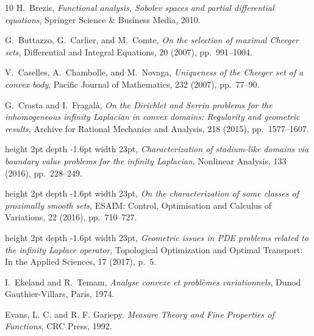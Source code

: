 \documentclass[reqno,11pt]{amsart}
\theoremstyle{definition}
\numberwithin{equation}{section}
\newcommand{\1}{{{\bf 1}\kern-0,28em\rm l}}
\begin{document}
\begin{thebibliography}{10}
{\sc H.~Brezis}, {\em Functional analysis, Sobolev spaces and partial
  differential equations}, Springer Science \& Business Media, 2010.
  


{\sc G.~Buttazzo, G.~Carlier, and M.~Comte}, {\em On the selection of maximal
  Cheeger sets}, Differential and Integral Equations, 20 (2007), pp.~991--1004.

{\sc V.~Caselles, A.~Chambolle, and M.~Novaga}, {\em Uniqueness of the Cheeger
  set of a convex body}, Pacific Journal of Mathematics, 232 (2007),
  pp.~77--90.

{\sc G.~Crasta and I.~Fragal{\`a}}, {\em On the Dirichlet and Serrin problems
  for the inhomogeneous infinity Laplacian in convex domains: Regularity and
  geometric results}, Archive for Rational Mechanics and Analysis, 218 (2015),
  pp.~1577--1607.

\leavevmode\vrule height 2pt depth -1.6pt width 23pt, {\em Characterization of
  stadium-like domains via boundary value problems for the infinity Laplacian},
  Nonlinear Analysis, 133 (2016), pp.~228--249.

\leavevmode\vrule height 2pt depth -1.6pt width 23pt, {\em On the
  characterization of some classes of proximally smooth sets}, ESAIM: Control,
  Optimisation and Calculus of Variations, 22 (2016), pp.~710--727.

\leavevmode\vrule height 2pt depth -1.6pt width 23pt, {\em Geometric issues in
  PDE problems related to the infinity Laplace operator}, Topological
  Optimization and Optimal Transport: In the Applied Sciences, 17 (2017), p.~5.

{\sc I.~Ekeland and R.~Temam}, {\em Analyse convexe et probl\`emes
  variationnels}, Dunod Gauthier-Villars, Paris, 1974.
  
 {\sc Evans, L. C. and  R. F. Gariepy}. {\em Measure Theory and Fine
Properties of Functions}, CRC Press, 1992.


\end{thebibliography}
\end{document}
